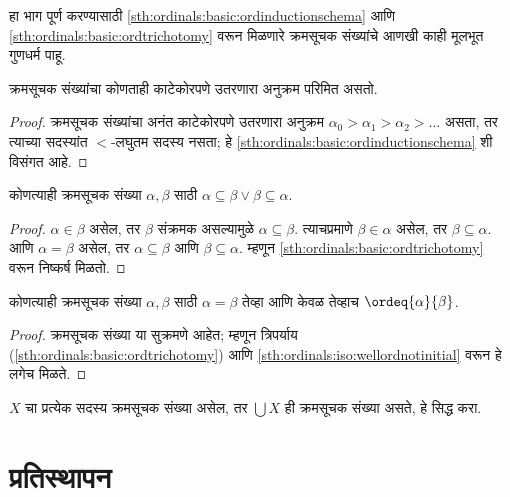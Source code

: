 हा भाग पूर्ण करण्यासाठी \ref{sth:ordinals:basic:ordinductionschema} आणि \ref{sth:ordinals:basic:ordtrichotomy} वरून मिळणारे क्रमसूचक संख्यांचे आणखी काही मूलभूत गुणधर्म पाहू.

\begin{prop}
क्रमसूचक संख्यांचा कोणताही काटेकोरपणे उतरणारा अनुक्रम परिमित असतो.
\end{prop}

\begin{proof}
क्रमसूचक संख्यांचा अनंत काटेकोरपणे उतरणारा अनुक्रम $\alpha_0 > \alpha_1 > \alpha_2 > \ldots$ असता, तर त्याच्या सदस्यांत $<$-लघुतम सदस्य नसता; हे \ref{sth:ordinals:basic:ordinductionschema} शी विसंगत आहे.
\end{proof}

\begin{prop}\label{sth:ordinals:basic:ordinalsaresubsets}
कोणत्याही क्रमसूचक संख्या $\alpha, \beta$ साठी $\alpha \subseteq \beta \lor \beta \subseteq \alpha$.
\end{prop}

\begin{proof}
$\alpha \in \beta$ असेल, तर $\beta$ संक्रमक असल्यामुळे $\alpha \subseteq \beta$. त्याचप्रमाणे $\beta \in \alpha$ असेल, तर $\beta \subseteq
\alpha$. आणि $\alpha = \beta$ असेल, तर $\alpha \subseteq \beta$ आणि $\beta \subseteq \alpha$. म्हणून \ref{sth:ordinals:basic:ordtrichotomy} वरून निष्कर्ष मिळतो.
\end{proof}

\begin{prop}\label{sth:ordinals:basic:ordisoidentity}
कोणत्याही क्रमसूचक संख्या $\alpha, \beta$ साठी $\alpha = \beta$ तेव्हा आणि केवळ तेव्हाच $\ordeq{\alpha}{\beta}$.
\end{prop}

\begin{proof}
क्रमसूचक संख्या या सुक्रमणे आहेत; म्हणून त्रिपर्याय (\ref{sth:ordinals:basic:ordtrichotomy}) आणि \ref{sth:ordinals:iso:wellordnotinitial} वरून हे लगेच मिळते.
\end{proof}

\begin{prob}\label{sth:ordinals:basic:probunionordinalsordinal}
$X$ चा प्रत्येक सदस्य क्रमसूचक संख्या असेल, तर $\bigcup X$ ही क्रमसूचक संख्या असते, हे सिद्ध करा.
\end{prob}








\section{प्रतिस्थापन}\label{sth:ordinals:replacement:sec}

